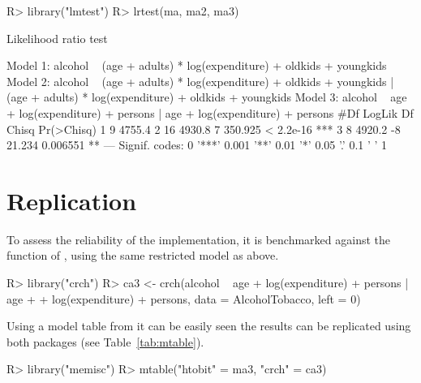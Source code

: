 \documentclass[nojss]{jss}
\begin{document}
\begin{Schunk}
\begin{Sinput}
R> library("lmtest")
R> lrtest(ma, ma2, ma3)
\end{Sinput}
\begin{Soutput}
Likelihood ratio test

Model 1: alcohol ~ (age + adults) * log(expenditure) + oldkids + youngkids
Model 2: alcohol ~ (age + adults) * log(expenditure) + oldkids + youngkids | 
    (age + adults) * log(expenditure) + oldkids + youngkids
Model 3: alcohol ~ age + log(expenditure) + persons | age + log(expenditure) + 
    persons
  #Df LogLik Df   Chisq Pr(>Chisq)    
1   9 4755.4                          
2  16 4930.8  7 350.925  < 2.2e-16 ***
3   8 4920.2 -8  21.234   0.006551 ** 
---
Signif. codes:  0 '***' 0.001 '**' 0.01 '*' 0.05 '.' 0.1 ' ' 1
\end{Soutput}
\end{Schunk}

\section{Replication}

To assess the reliability of the  implementation, it is benchmarked against the 
function of \citep{crch}, using the same restricted model as above.

\begin{Schunk}
\begin{Sinput}
R> library("crch")
R> ca3 <- crch(alcohol ~ age + log(expenditure) + persons | age +
+    log(expenditure) + persons, data = AlcoholTobacco, left = 0)
\end{Sinput}
\end{Schunk}

Using a model table from  \citep{memisc} it can be easily seen the results can be
replicated using both packages (see Table~\ref{tab:mtable}).

\begin{Schunk}
\begin{Sinput}
R> library("memisc")
R> mtable("htobit" = ma3, "crch" = ca3)
\end{Sinput}
\end{Schunk}
\end{document}
